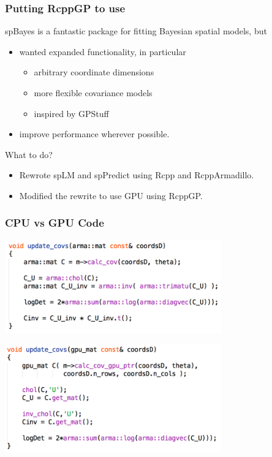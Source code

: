 \documentclass[slidestop,mathserif]{beamer}
\begin{document}

\begin{frame}
\frametitle{Putting RcppGP to use}

spBayes is a fantastic package for fitting Bayesian spatial models, but

\vspace{4mm}

\begin{itemize}
\item wanted expanded functionality, in particular

\begin{itemize}
\item arbitrary coordinate dimensions
\item more flexible covariance models
\item inspired by GPStuff
\end{itemize}

\item improve performance wherever possible.
\end{itemize}

\pause
\vspace{5mm}
What to do?

\pause

\begin{itemize}
\item Rewrote spLM and spPredict using Rcpp and RcppArmadillo.
\vspace{2mm}
\item Modified the rewrite to use GPU using RcppGP.
\end{itemize}
\end{frame}


\begin{frame}
\frametitle{CPU vs GPU Code}

\begin{center}
\vspace{-5mm}
\includegraphics[width=0.7\textwidth]{figs/cpu_cov.png}

\vspace{5mm}

\includegraphics[width=0.7\textwidth]{figs/gpu_cov.png}
\end{center}
\end{frame}
\end{document}
